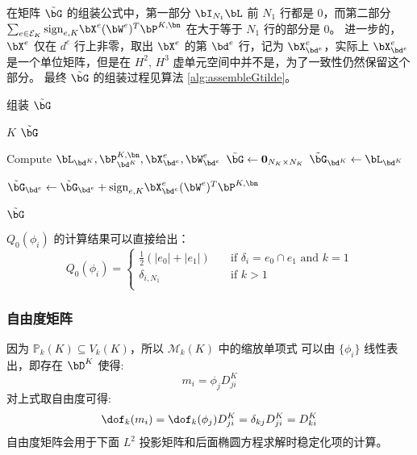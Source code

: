 \begin{remark}
在矩阵 $\tilde{\bG}$ 的组装公式中，第一部分 $\bI_{N_1}\bL$ 前
$N_1$ 行都是 0，而第二部分 $\sum_{e\in\mathcal{E}_K} \mathrm{sign}_{e, K}
\bX^e (\bW^{e})^T\bP^{K, \bn}$ 在大于等于 $N_1$ 行的部分是 0。
进一步的，$\bX^e$ 仅在 $d^e$ 行上非零，取出 $\bX^e$ 的第 $\bd^e$ 行，记为
$\bX^e_{\bd^e}$，实际上 $\bX^e_{\bd^e}$ 是一个单位矩阵，但是在 $H^2$, $H^3$
虚单元空间中并不是，为了一致性仍然保留这个部分。
最终 $\tilde{\bG}$ 的组装过程见算法 \ref{alg:assembleGtilde}。

\begin{algorithm}
\caption{组装 $\tilde{\bG}$}\label{alg:assembleGtilde}
\begin{algorithmic}[1]
\Require $K$ 
\Ensure $\tilde{\bG}$ 

\State Compute $\bL_{\bd^K}, \bP^{K, \bn}_{\bd^K}, \bX^e_{\bd^e}, \bW^e_{\bd^e}$
\State $\tilde{\bG} \gets \boldsymbol{0}_{N_K \times N_K}$
\State $\tilde{\bG}_{\bd^K} \gets \bL_{\bd^K}$

    \State $\tilde{\bG}_{\bd^e} \gets \tilde{\bG}_{\bd^e} + \mathrm{sign}_{e, K} \bX^e_{\bd^e} (\bW^{e})^T \bP^{K, \bn}$
\EndFor

\State \Return $\tilde{\bG}$
\end{algorithmic}
\end{algorithm}
\end{remark}

\begin{remark}
$Q_0(\phi_i)$ 的计算结果可以直接给出：
$$
Q_0(\phi_i) = 
\begin{cases}
    \frac{1}{2}(|e_0| + |e_1|) & \quad \text{if $\delta_i = e_0\cap e_1$ and $k = 1$}\\
    \delta_{i, N_1} & \quad \text{if $k>1$}\\
\end{cases}
$$
\end{remark}

\subsubsection{自由度矩阵}
因为 $\mathbb{P}_k(K)\subseteq V_k(K)$，所以 $\mathcal{M}_k(K)$ 中的缩放单项式
可以由 $\{\phi_i\}$ 线性表出，即存在 $\bD^{K}$ 使得:
$$
m_{i} = \phi_j D^{K}_{ji} 
$$
对上式取自由度可得:
$$
\dof_k(m_i) = \dof_k(\phi_j) D^{K}_{ji} = \delta_{kj}D^{K}_{ji} = D^{K}_{ki}
$$
自由度矩阵会用于下面 $L^2$ 投影矩阵和后面椭圆方程求解时稳定化项的计算。

